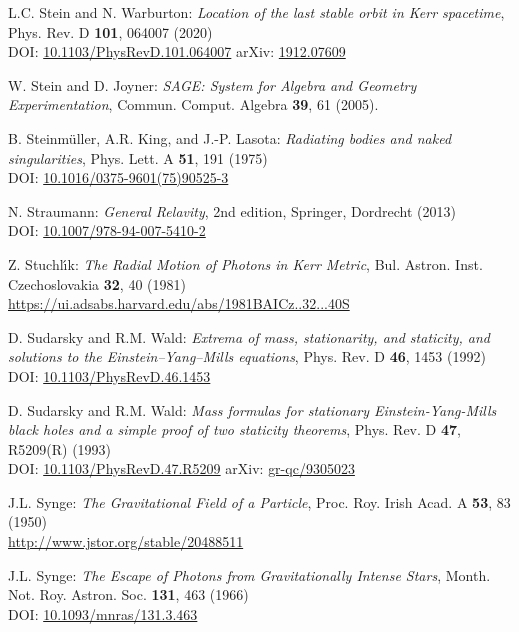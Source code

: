 \begin{thebibliography}{123}
L.C. Stein and N. Warburton:
{\em Location of the last stable orbit in Kerr spacetime},
Phys. Rev. D  {\bf 101}, 064007 (2020)\\
DOI: \href{https://doi.org/10.1103/PhysRevD.101.064007}{10.1103/PhysRevD.101.064007}\hfill
arXiv: \href{https://arxiv.org/abs/1912.07609}{1912.07609}

W. Stein and D. Joyner: {\em SAGE: System for Algebra and Geometry Experimentation},
Commun. Comput. Algebra {\bf 39}, 61 (2005).

B. Steinmüller, A.R. King, and J.-P. Lasota:
{\em Radiating bodies and naked singularities},
Phys. Lett. A {\bf 51}, 191 (1975)\\
DOI: \href{https://doi.org/10.1016/0375-9601(75)90525-3}{10.1016/0375-9601(75)90525-3}

N. Straumann: \emph{General Relavity}, 2nd edition,
Springer, Dordrecht (2013)\\
DOI: \href{https://doi.org/10.1007/978-94-007-5410-2}{10.1007/978-94-007-5410-2}

Z. Stuchl\'{\i}k: {\em The Radial Motion of Photons in Kerr Metric},
Bul. Astron. Inst. Czechoslovakia {\bf 32}, 40 (1981)\\
\url{https://ui.adsabs.harvard.edu/abs/1981BAICz..32...40S}

D. Sudarsky and R.M. Wald: {\em Extrema of mass, stationarity, and staticity,
and solutions to the Einstein–Yang–Mills equations},
Phys. Rev. D {\bf 46}, 1453 (1992)\\
DOI: \href{https://doi.org/10.1103/PhysRevD.46.1453}{10.1103/PhysRevD.46.1453}

D. Sudarsky and R.M. Wald:
{\em Mass formulas for stationary Einstein-Yang-Mills black holes and a simple proof of two staticity theorems},
Phys. Rev. D {\bf 47}, R5209(R) (1993)\\
DOI: \href{https://doi.org/10.1103/PhysRevD.47.R5209}{10.1103/PhysRevD.47.R5209}\hfill
arXiv: \href{https://arxiv.org/abs/gr-qc/9305023}{gr-qc/9305023}

J.L. Synge: {\em The Gravitational Field of a Particle},
Proc. Roy. Irish Acad. A {\bf 53}, 83 (1950)\\
\url{http://www.jstor.org/stable/20488511}

J.L. Synge: {\em The Escape of Photons from Gravitationally Intense Stars},
Month. Not. Roy. Astron. Soc. {\bf 131}, 463 (1966)\\
DOI: \href{https://doi.org/10.1093/mnras/131.3.463}{10.1093/mnras/131.3.463}


\end{thebibliography}
